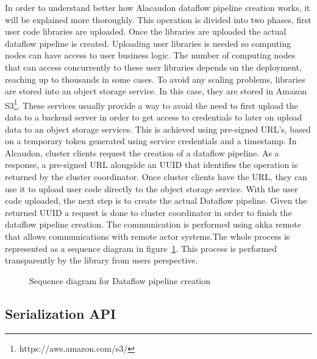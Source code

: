 In order to understand better how Alacaudon dataflow pipeline creation works, it
will be explained more thoroughly. This operation is divided into two phases,
first user code libraries are uploaded. Once the libraries are uploaded the
actual dataflow pipeline is created. Uploading user libraries is needed so
computing nodes can have access to user business logic. The number of computing nodes that
can access concurrently to these user libraries depends on the deployment,
reaching up to thousands in some cases. To avoid any scaling problems, libraries
are stored into an object storage service. In this case, they are stored in
Amazon S3\footnote{https://aws.amazon.com/s3/}. These services usually provide a
way to avoid the need to first upload the data to a backend server in order to
get access to credentials to later on upload data to an object storage services.
This is achieved using pre-signed URL's, based on a temporary token generated
using service credentials and a timestamp. In Alcaudon, cluster clients
request the creation of a dataflow pipeline. As a response, a pre-signed URL
alongside an UUID that identifies the operation is returned by the cluster
coordinator. Once cluster clients have the URL, they can use it to upload user
code directly to the object storage service. With the user code uploaded, the
next step is to create the actual Dataflow pipeline. Given the returned UUID a
request is done to cluster coordinator in order to finish the dataflow pipeline
creation. The communication is performed using akka remote that allows
communications with remote actor systems.The whole process is represented as a
sequence diagram in figure~\ref{fig:pipelinecreation}. This process is performed
transparently by the library from users perspective.

\begin{figure}[!h]
  \centering
  \scalebox{0.6}{
    
  }
\caption{Sequence diagram for Dataflow pipeline creation}
\label{fig:pipelinecreation}
\end{figure}

\subsection{Serialization API}

